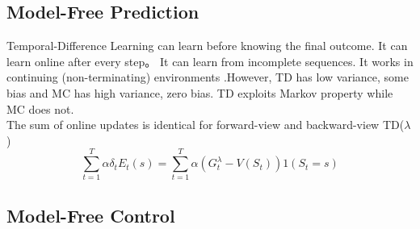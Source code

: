 \documentclass[10pt,twocolumn,letterpaper]{article}
\begin{document}
	\subsection{Model-Free Prediction}
	
	Temporal-Difference Learning can learn before knowing the final outcome. It can learn online after every step。 It can learn from incomplete sequences. It works in continuing (non-terminating) environments .However, TD has low variance, some bias and MC has high variance, zero bias. TD exploits Markov property while MC does not.\\
	The sum of online updates is identical for forward-view and backward-view TD($\lambda$)
	\begin{equation}
		\sum_{t=1}^{T}\alpha \delta_tE_t(s) = \sum_{t=1}^{T}\alpha (G_t^\lambda-V(S_t))1(S_t=s)
	\end{equation}
	
	\subsection{Model-Free Control}
\end{document}
